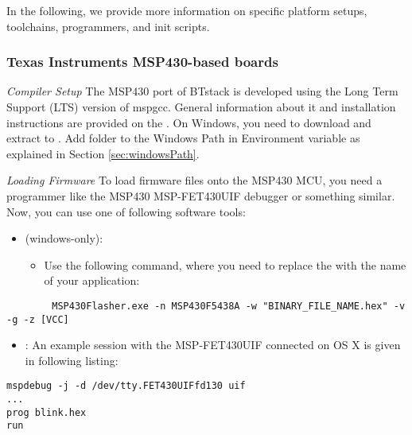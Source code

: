 
In the following, we provide more information on specific platform setups, toolchains, programmers, and init scripts.

\subsubsection{Texas Instruments MSP430-based boards}

\emph{Compiler Setup} The MSP430 port of BTstack is developed using the Long Term Support (LTS) version of mspgcc. General information about it and installation instructions are provided on the \MSPGCCWiki{}. On Windows, you need to download and extract \mspgcc{} to . Add  folder to the Windows Path in Environment variable as explained in Section \ref{sec:windowsPath}.

\emph{Loading Firmware} To load firmware files onto the MSP430 MCU, you need a programmer like the MSP430 MSP-FET430UIF debugger or something similar. Now, you can use one of following software tools:

 \begin{itemize}
 \item  \MSPFlasher{} (windows-only):
 	\begin{itemize}
 	   \item Use the following command, where you need to replace the  with the name of your application:
	\end{itemize} 
\end{itemize}
	
	   \begin{lstlisting}
 		MSP430Flasher.exe -n MSP430F5438A -w "BINARY_FILE_NAME.hex" -v -g -z [VCC]
	   \end{lstlisting}

 \begin{itemize}
	
	\item \MSPDebug{}: An example session with the MSP-FET430UIF connected on OS X is given in following listing:
\end{itemize}

\begin{lstlisting}
mspdebug -j -d /dev/tty.FET430UIFfd130 uif
... 
prog blink.hex
run
\end{lstlisting}

